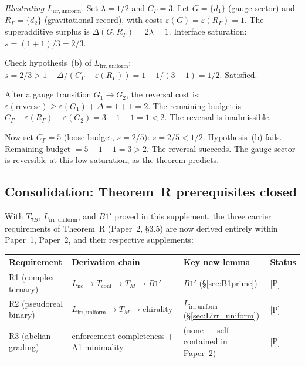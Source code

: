 \documentclass[11pt,a4paper]{article}
\theoremstyle{definition}
\newcommand{\eps}{\varepsilon}
\begin{document}
\smallskip\noindent\textit{Illustrating $L_{\mathrm{irr,uniform}}$.}\quad
Set $\lambda = 1/2$ and $C_\Gamma = 3$.
Let $G = \{d_1\}$ (gauge sector) and $R_\Gamma = \{d_2\}$ (gravitational
record), with costs $\eps(G) = \eps(R_\Gamma) = 1$.
The superadditive surplus is $\Delta(G, R_\Gamma) = 2\lambda = 1$.
Interface saturation: $s = (1 + 1)/3 = 2/3$.

Check hypothesis~(b) of $L_{\mathrm{irr,uniform}}$:
$s = 2/3 > 1 - \Delta/(C_\Gamma - \eps(R_\Gamma))
= 1 - 1/(3 - 1) = 1/2$.  Satisfied.

After a gauge transition $G_1 \to G_2$, the reversal cost is:
$\eps(\text{reverse}) \ge \eps(G_1) + \Delta = 1 + 1 = 2$.
The remaining budget is $C_\Gamma - \eps(R_\Gamma) - \eps(G_2)
= 3 - 1 - 1 = 1 < 2$.  The reversal is inadmissible.

Now set $C_\Gamma = 5$ (loose budget, $s = 2/5$):
$s = 2/5 < 1/2$.  Hypothesis~(b) fails.
Remaining budget $= 5 - 1 - 1 = 3 > 2$.  The reversal succeeds.
The gauge sector is reversible at this low saturation, as the theorem
predicts.


\subsection{Consolidation: Theorem~R prerequisites closed}
\label{sec:TR_closed}

With $T_{7B}$, $L_{\mathrm{irr,uniform}}$, and $B1'$ proved in this
supplement, the three carrier requirements of Theorem~R
(Paper~2, §3.5) are now derived entirely within Paper~1, Paper~2, and
their respective supplements:

\smallskip
\begin{center}
\small
\begin{tabular}{@{}llll@{}}
\toprule
\textbf{Requirement} & \textbf{Derivation chain} & \textbf{Key new lemma} & \textbf{Status} \\
\midrule
R1 (complex ternary) &
  $L_{\mathrm{nc}} \to T_{\mathrm{conf}} \to T_M \to B1'$ &
  $B1'$ (\S\ref{sec:B1prime}) &
  [P] \\
R2 (pseudoreal binary) &
  $L_{\mathrm{irr,uniform}} \to T_M \to \text{chirality}$ &
  $L_{\mathrm{irr,uniform}}$ (\S\ref{sec:Lirr_uniform}) &
  [P] \\
R3 (abelian grading) &
  enforcement completeness + A1 minimality &
  (none --- self-contained in Paper~2) &
  [P] \\
\bottomrule
\end{tabular}
\end{center}
\end{document}
